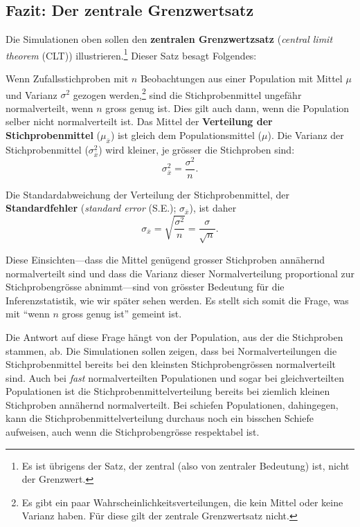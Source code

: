 \documentclass[oneside, 10pt]{book}\usepackage[]{graphicx}\usepackage[]{xcolor}
\begin{document}
\subsection{Fazit: Der zentrale Grenzwertsatz}
Die Simulationen oben sollen den \textbf{zentralen Grenzwertzsatz}
(\textit{central limit theorem} (CLT)) illustrieren.\footnote{Es ist übrigens der Satz, der zentral (also von zentraler Bedeutung) ist, nicht der Grenzwert.} Dieser
Satz besagt Folgendes:

Wenn Zufallsstichproben mit $n$ Beobachtungen
aus einer Population
mit Mittel $\mu$ und Varianz $\sigma^2$
gezogen werden,\footnote{Es gibt ein paar Wahrscheinlichkeitsverteilungen,
die kein Mittel oder keine Varianz haben.
Für diese gilt der zentrale Grenzwertsatz nicht.}
sind die Stichprobenmittel
ungefähr normalverteilt, wenn $n$ gross genug ist.
Dies gilt auch dann,
wenn die Population selber nicht normalverteilt ist.
Das Mittel der \textbf{Verteilung der Stichprobenmittel}
($\mu_{\bar{x}}$) ist gleich dem Populationsmittel ($\mu$).
Die Varianz der Stichprobenmittel ($\sigma^2_{\bar{x}}$)
wird kleiner, je grösser die Stichproben sind:
\begin{equation*}
\sigma^2_{\bar{x}} = \frac{\sigma^2}{n}.
\end{equation*}

Die Standardabweichung der Verteilung der Stichprobenmittel,
der \textbf{Standardfehler} (\textit{standard error} (S.E.); $\sigma_{\bar{x}}$),
ist daher
\begin{equation*}
\sigma_{\bar{x}} = \sqrt{\frac{\sigma^2}{n}} = \frac{\sigma}{\sqrt{n}}.
\end{equation*}

Diese Einsichten---dass die Mittel genügend grosser
Stichproben annähernd normalverteilt sind und dass
die Varianz dieser Normalverteilung proportional zur
Stichprobengrösse ab\-nimmt---sind von grösster Bedeutung
für die Inferenzstatistik, wie wir später sehen werden.
Es stellt sich somit die Frage, was mit ``wenn $n$ gross genug ist''
gemeint ist.

Die Antwort auf diese Frage hängt von der Population,
aus der die Stichproben stammen, ab. Die Simulationen
sollen zeigen, dass bei Normalverteilungen
die Stichprobenmittel bereits
bei den kleinsten Stichprobengrössen
normalverteilt sind.
Auch bei \emph{fast} normalverteilten Populationen
und sogar bei gleichverteilten Populationen
ist die Stichprobenmittelverteilung bereits bei
ziemlich kleinen Stichproben annähernd normalverteilt.
Bei schiefen Populationen, dahingegen,
kann die Stichprobenmittelverteilung durchaus
noch ein bisschen Schiefe aufweisen, auch
wenn die Stichprobengrösse respektabel ist.
\end{document}
